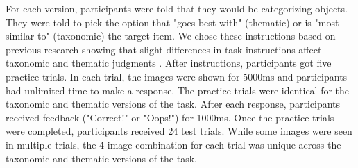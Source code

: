 \documentclass[../dissertation.tex]{subfiles}
\begin{document}
For each version, participants were told that they would be categorizing objects. They were told to pick the option that "goes best with" (thematic) or is "most similar to" (taxonomic) the target item. We chose these instructions based on previous research showing that slight differences in task instructions affect taxonomic and thematic judgments \citep{Lin2001}. After instructions, participants got five practice trials. In each trial, the images were shown for 5000ms and participants had unlimited time to make a response. The practice trials were identical for the taxonomic and thematic versions of the task. After each response, participants received feedback ("Correct!" or "Oops!") for 1000ms. Once the practice trials were completed, participants received 24 test trials. While some images were seen in multiple trials, the 4-image combination for each trial was unique across the taxonomic and thematic versions of the task.
\end{document}
